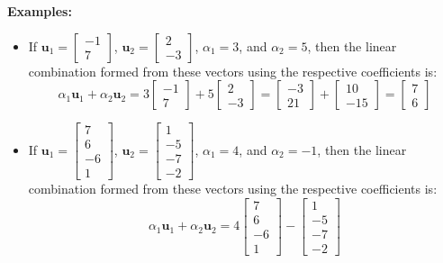 \documentclass{article}
\begin{document}
\textbf{Examples:}
\begin{itemize}
\item If \(\mathbf{u}_1 = \begin{bmatrix} -1 \\ 7 \end{bmatrix}\), \(\mathbf{u}_2 = \begin{bmatrix} 2 \\ -3 \end{bmatrix}\), \(\alpha_1 = 3\), and \(\alpha_2 = 5\), then the linear combination formed from these vectors using the respective coefficients is:
\[\alpha_1\mathbf{u}_1 + \alpha_2\mathbf{u}_2 = 3\begin{bmatrix} -1 \\ 7 \end{bmatrix} + 5\begin{bmatrix} 2 \\ -3 \end{bmatrix} = \begin{bmatrix} -3 \\ 21 \end{bmatrix} + \begin{bmatrix} 10 \\ -15 \end{bmatrix} = \begin{bmatrix} 7 \\ 6 \end{bmatrix}\]
\item If \(\mathbf{u}_1 = \begin{bmatrix} 7 \\ 6 \\ -6 \\ 1 \end{bmatrix}\), \(\mathbf{u}_2 = \begin{bmatrix} 1 \\ -5 \\ -7 \\ -2 \end{bmatrix}\), \(\alpha_1 = 4\), and \(\alpha_2 = -1\), then the linear combination formed from these vectors using the respective coefficients is:
\[\alpha_1\mathbf{u}_1 + \alpha_2\mathbf{u}_2 = 4\begin{bmatrix} 7 \\ 6 \\ -6 \\ 1 \end{bmatrix} - \begin{bmatrix} 1 \\ -5 \\ -7 \\ -2 \end{bmatrix}
\]
\end{itemize}
\end{document}
